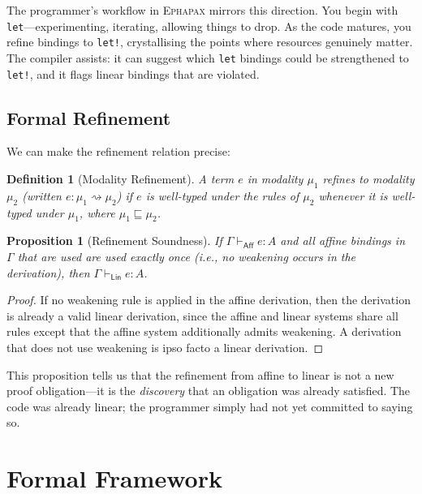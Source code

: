\documentclass[11pt,a4paper]{article}
\newtheorem{proposition}[theorem]{Proposition}
\newtheorem{definition}[theorem]{Definition}
\newcommand{\Linear}{\textsf{Lin}}
\newcommand{\Affine}{\textsf{Aff}}
\newcommand{\ephapax}{\textsc{Ephapax}}
\newcommand{\letbang}{\texttt{let!}}
\newcommand{\letkw}{\texttt{let}}
\begin{document}
The programmer's workflow in \ephapax{} mirrors this direction. You
begin with \letkw{}---experimenting, iterating, allowing things to
drop. As the code matures, you refine bindings to \letbang{},
crystallising the points where resources genuinely matter. The
compiler assists: it can suggest which \letkw{} bindings could be
strengthened to \letbang{}, and it flags linear bindings that are
violated.

\subsection{Formal Refinement}

We can make the refinement relation precise:

\begin{definition}[Modality Refinement]
A term $e$ in modality $\mu_1$ \emph{refines to} modality $\mu_2$
(written $e : \mu_1 \rightsquigarrow \mu_2$) if $e$ is well-typed
under the rules of $\mu_2$ whenever it is well-typed under $\mu_1$,
where $\mu_1 \sqsubseteq \mu_2$.
\end{definition}

\begin{proposition}[Refinement Soundness]
\label{prop:refinement-sound}
If $\Gamma \vdash_{\Affine} e : A$ and all affine bindings in
$\Gamma$ that are used are used exactly once (i.e., no weakening
occurs in the derivation), then $\Gamma \vdash_{\Linear} e : A$.
\end{proposition}

\begin{proof}
If no weakening rule is applied in the affine derivation, then the
derivation is already a valid linear derivation, since the affine
and linear systems share all rules except that the affine system
additionally admits weakening. A derivation that does not use
weakening is ipso facto a linear derivation.
\end{proof}

This proposition tells us that the refinement from affine to linear
is not a new proof obligation---it is the \emph{discovery} that an
obligation was already satisfied. The code was already linear; the
programmer simply had not yet committed to saying so.


\section{Formal Framework}
\label{sec:formal}
\end{document}
